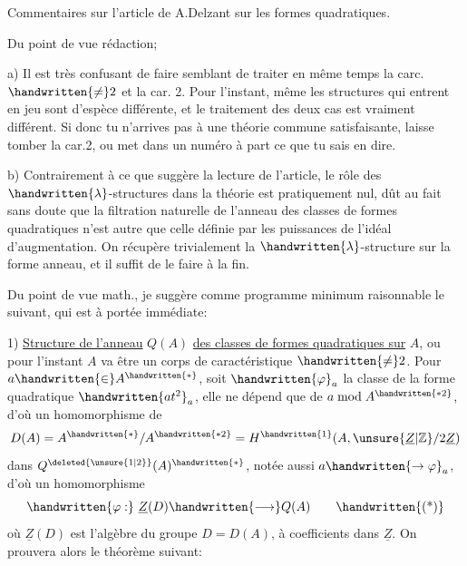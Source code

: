 \begin{flushright}\end{flushright}

\begin{center}Commentaires sur l'article de A.Delzant sur les formes quadratiques.\end{center}

Du point de vue rédaction;

a) Il est très confusant de faire semblant de traiter en même temps la carc. $\handwritten{\ne}2$ et la car. 2. Pour l'instant, même les structures qui entrent en jeu sont d'espèce différente, et le traitement des deux cas est vraiment différent. Si donc tu n'arrives pas à une théorie commune satisfaisante, laisse tomber la car.2, ou met dans un numéro à part ce que tu sais en dire.

b) Contrairement à ce que suggère la lecture de l'article, le rôle des $\handwritten{\lambda}$-structures dans la théorie est pratiquement nul, dût au fait sans doute que la filtration naturelle de l'anneau des classes de formes quadratiques n'est autre que celle définie par les puissances de l'idéal d'augmentation. On récupère trivialement la $\handwritten{\lambda}$-structure sur la forme   anneau, et il suffit de le faire à la fin.

 Du point de vue math., je suggère comme programme minimum raisonnable le suivant, qui est à portée immédiate:

1) \uline{Structure de l'anneau} $Q(A)$ \uline{des classes de formes quadratiques sur} $A$, ou pour l'instant $A$ va être un corps de caractéristique $\handwritten{\ne}2$. Pour $a\handwritten{\in}A^{\handwritten{*}}$, soit $\handwritten{\varphi}_a$ la classe de la forme quadratique $\handwritten{at^2}_{a}$, elle ne dépend que de $a\bmod A^{\handwritten{*2}}$, d'où un homomorphisme de
\[
D(A)=A^{\handwritten{*}}/A^{\handwritten{*2}}=H^{\handwritten{1}}(A,\unsure{\underline{Z}|\mathbb{Z}}/2\underline{Z})
\]
dans $Q^{\deleted{\unsure{1|2}}}(A)^{\handwritten{*}}$, notée aussi $a\handwritten{\to\varphi}_a$, d'où un homomorphisme
\[
\handwritten{\varphi:}\ \underline{Z}(D)\handwritten{\longrightarrow}Q(A)
\tag*{\handwritten{(*)}}
\]
où $\underline{Z}(D)$ est l'algèbre du groupe $D=D(A)$, à coefficients dans $\underline{Z}$. On prouvera alors le théorème suivant:

